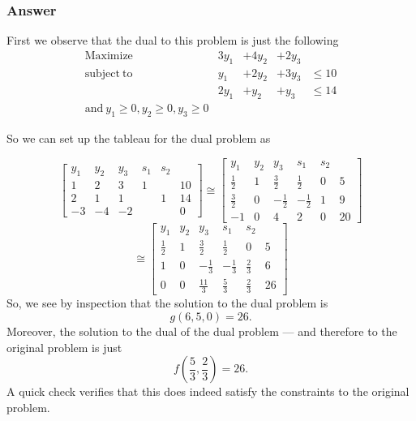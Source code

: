 \documentclass[12pt]{article}
\begin{document}
\subsubsection{Answer}
First we observe that the dual to this problem is just the following
\[
\begin{array}{lrrrr}
\mathrm{Maximize} & 3 y_1 &+ 4 y_2 &+ 2 y_3\\
\mathrm{subject\ to} & y_1 &+ 2 y_2 &+ 3 y_3& \leq 10\\
&2 y_1 &+ y_2 &+ y_3& \leq 14\\
\mathrm{and\ }y_1\geq0, y_2 \geq 0 , y_3 \geq 0
\end{array}
\]

So we can set up the tableau for the dual problem as 

\[ \left[ \begin{array}{ccc|cc|c}
y_1 & y_2 & y_3 & s_1 & s_2  & \\
\hline
1&2&3&1&& 10\\
2&1&1&&1&14\\
\hline
-3&-4&-2&&&0
\end{array}\right]
\cong
 \left[ \begin{array}{ccc|cc|c}
y_1 & y_2 & y_3 & s_1 & s_2  & \\
\hline
\frac{1}{2}&1&\frac{3}{2}&\frac{1}{2}&0& 5\\
\frac{3}{2}&0&-\frac{1}{2}&-\frac{1}{2}&1&9\\
\hline
-1&0&4&2&0&20
\end{array}\right]
\]
\[ \cong
 \left[ \begin{array}{ccc|cc|c}
y_1 & y_2 & y_3 & s_1 & s_2  & \\
\hline
\frac{1}{2}&1&\frac{3}{2}&\frac{1}{2}&0& 5\\
1&0&-\frac{1}{3}&-\frac{1}{3}&\frac{2}{3}&6\\
\hline
0&0&\frac{11}{3}&\frac{5}{3}&\frac{2}{3}&26
\end{array}\right]
\]
So, we see by inspection that the solution to the dual problem is
\[ g\left( 6,5,0 \right) = 26 .\]
Moreover, the solution to the dual of the dual problem --- and therefore to the original problem is just 
\[f\left( \frac{5}{3} , \frac{2}{3} \right) = 26.\]
A quick check verifies that this does indeed satisfy the constraints to the original problem.
\end{document}
